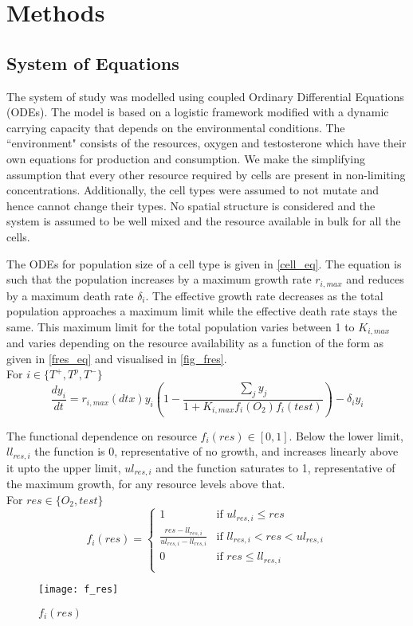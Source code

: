 \chapter{Methods}

\section{System of Equations}
The system of study was modelled using coupled Ordinary Differential Equations (ODEs). The model is based on a logistic framework modified with a dynamic carrying capacity that depends on the environmental conditions. The ``environment" consists of the resources, oxygen and testosterone which have their own equations for production and consumption. We make the simplifying assumption that every other resource required by cells are present in non-limiting concentrations. Additionally, the cell types were assumed to not mutate and hence cannot change their types. No spatial structure is considered and the system is assumed to be well mixed and the resource available in bulk for all the cells.

The ODEs for population size of a cell type is given in \autoref{cell_eq}. The equation is such that the population increases by a maximum growth rate $r_{i,max}$ and reduces by a maximum death rate $\delta_i$. The effective growth rate decreases as the total population approaches a maximum limit while the effective death rate stays the same. This maximum limit for the total population varies between 1 to $K_{i,max}$ and varies depending on the resource availability as a function of the form as given in \autoref{fres_eq} and visualised in \autoref{fig_fres}.\\
For $i \in \{T^+,T^p,T^-\}$
\begin{equation}
  \frac{dy_i}{dt} = r_{i,max}(dtx) y_i (1 - \frac{\sum_j y_j}{1 + K_{i,max} f_i(O_2) f_i(test)} )- \delta_i y_i
  \label{cell_eq}
\end{equation}

The functional dependence on resource $f_i(res) \in [0,1]$. Below the lower limit, $ll_{res,i}$ the function is 0, representative of no growth, and increases linearly above it upto the upper limit, $ul_{res,i}$ and the function saturates to 1, representative of the maximum growth, for any resource levels above that.\\
For $res \in \{O_2,test\}$
\begin{equation}
  f_i(res) = \begin{cases}
  1 &\text{if } ul_{res,i} \leq res \\
  \frac{res-ll_{res,i}}{ul_{res,i}-ll_{res,i}} &\text{if } ll_{res,i} < res < ul_{res,i} \\
  0 &\text{if } res \leq ll_{res,i} \\
  \end{cases}
  \label{fres_eq}
\end{equation}
\begin{figure}[h]
  \centering
  \texttt{[image: f\_res]}
  \caption{$f_i(res)$}
  \label{fig_fres}
\end{figure}

